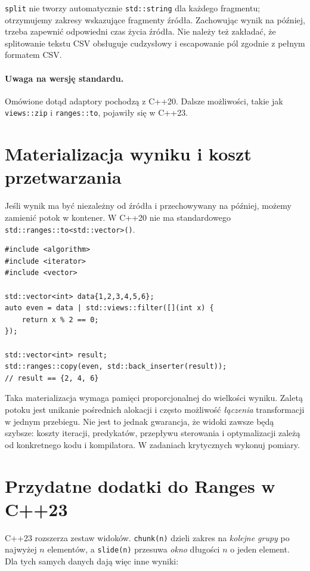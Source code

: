 \texttt{split} nie tworzy automatycznie \texttt{std::string} dla
każdego fragmentu; otrzymujemy zakresy wskazujące fragmenty źródła.
Zachowując wynik na później, trzeba zapewnić odpowiedni czas życia
źródła. Nie należy też zakładać, że splitowanie tekstu CSV obsługuje
cudzysłowy i escapowanie pól zgodnie z pełnym formatem CSV.

\paragraph{Uwaga na wersję standardu.}
Omówione dotąd adaptory pochodzą z C++20. Dalsze możliwości, takie jak
\texttt{views::zip} i \texttt{ranges::to}, pojawiły się w C++23.

\section{Materializacja wyniku i koszt przetwarzania}
\label{sec:cpp8-materialize}

Jeśli wynik ma być niezależny od źródła i przechowywany na później,
możemy zamienić potok w kontener. W C++20 nie ma standardowego
\texttt{std::ranges::to<std::vector>()}.

\begin{lstlisting}
#include <algorithm>
#include <iterator>
#include <vector>

std::vector<int> data{1,2,3,4,5,6};
auto even = data | std::views::filter([](int x) {
    return x % 2 == 0;
});

std::vector<int> result;
std::ranges::copy(even, std::back_inserter(result));
// result == {2, 4, 6}
\end{lstlisting}

Taka materializacja wymaga pamięci proporcjonalnej do wielkości wyniku.
Zaletą potoku jest unikanie pośrednich alokacji i często możliwość
\emph{łączenia} transformacji w jednym przebiegu. Nie jest to jednak
gwarancja, że widoki zawsze będą szybsze: koszty iteracji, predykatów,
przepływu sterowania i optymalizacji zależą od konkretnego kodu i
kompilatora. W zadaniach krytycznych wykonuj pomiary.

\section{Przydatne dodatki do Ranges w C++23}
\label{sec:cpp8-cpp23}

C++23 rozszerza zestaw widoków. \texttt{chunk(n)} dzieli zakres na
\emph{kolejne grupy} po najwyżej \(n\) elementów, a \texttt{slide(n)}
przesuwa \emph{okno} długości \(n\) o jeden element. Dla tych samych
danych dają więc inne wyniki:

